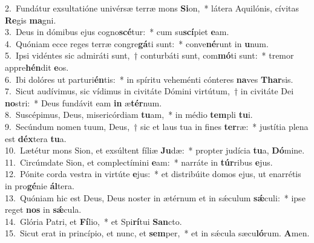 {2.~}Fundátur exsultatióne univérsæ terræ mons \textbf{Si}on,~* látera Aquilónis, cívitas \textbf{Re}gis \textbf{ma}gni.\\
{3.~}Deus in dómibus ejus cogno\textbf{scé}tur:~* cum su\textbf{scí}piet \textbf{e}am.\\
{4.~}Quóniam ecce reges terræ congre\textbf{gá}ti sunt:~* conve\textbf{né}runt in \textbf{u}num.\\
{5.~}Ipsi vidéntes sic admiráti sunt,~† conturbáti sunt, com\textbf{mó}ti sunt:~* tremor appre\textbf{hén}dit \textbf{e}os.\\
{6.~}Ibi dolóres ut parturi\textbf{én}tis:~* in spíritu veheménti cónteres \textbf{na}ves \textbf{Thar}sis.\\
{7.~}Sicut audívimus, sic vídimus in civitáte Dómini virtútum,~† in civitáte Dei \textbf{no}stri:~* Deus fundávit eam \textbf{in} æ\textbf{tér}num.\\
{8.~}Suscépimus, Deus, misericórdiam \textbf{tu}am,~* in médio \textbf{tem}pli \textbf{tu}i.\\
{9.~}Secúndum nomen tuum, Deus,~† sic et laus tua in fines \textbf{ter}ræ:~* justítia plena est \textbf{déx}tera \textbf{tu}a.\\
{10.~}Lætétur mons Sion, et exsúltent fíliæ \textbf{Ju}dæ:~* propter judícia \textbf{tu}a, \textbf{Dó}mine.\\
{11.~}Circúmdate Sion, et complectímini \textbf{e}am:~* narráte in \textbf{túr}ribus \textbf{e}jus.\\
{12.~}Pónite corda vestra in virtúte \textbf{e}jus:~* et distribúite domos ejus, ut enarrétis in pro\textbf{gé}nie \textbf{ál}tera.\\
{13.~}Quóniam hic est Deus, Deus noster in ætérnum et in sǽculum \textbf{sǽ}culi:~* ipse reget \textbf{nos} in \textbf{sǽ}cula.\\
{14.~}Glória Patri, et \textbf{Fí}lio,~* et Spi\textbf{rí}tui \textbf{San}cto.\\
{15.~}Sicut erat in princípio, et nunc, et \textbf{sem}per,~* et in sǽcula sæcu\textbf{ló}rum. \textbf{A}men.\\
